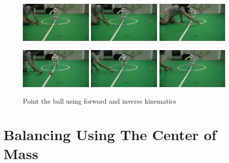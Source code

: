 \begin{figure}[!h]
\centerline{
\includegraphics[width=0.32\textwidth]{Figures/Demo1/1.png}
\includegraphics[width=0.32\textwidth]{Figures/Demo1/2.png}
\includegraphics[width=0.32\textwidth]{Figures/Demo1/3.png}
}
\vspace*{0.06cm}
\centerline{
\includegraphics[width=0.32\textwidth]{Figures/Demo1/4.png}
\includegraphics[width=0.32\textwidth]{Figures/Demo1/5.png}
\includegraphics[width=0.32\textwidth]{Figures/Demo1/6.png}
}
\vspace{-0.1cm}
\caption{Point the ball using forward and inverse kinematics}
\label{demo1}
\vspace*{0.5cm}
\end{figure}
\section{Balancing Using The Center of Mass}

